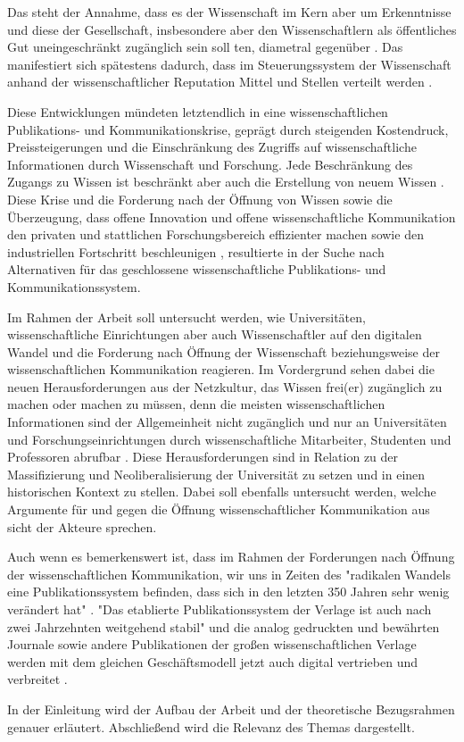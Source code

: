 Das steht der Annahme, dass es der Wissenschaft im Kern aber um Erkenntnisse und diese der Gesellschaft, insbesondere aber den Wissenschaftlern als öffentliches Gut uneingeschränkt zugänglich sein soll ten\cite{hanekop_2006}, diametral gegenüber \cite{offhaus_2012_institutionelle_repos}. Das manifestiert sich spätestens dadurch, dass im Steuerungssystem der Wissenschaft anhand der wissenschaftlicher Reputation Mittel und Stellen verteilt werden \cite{cite:4}.

Diese Entwicklungen mündeten letztendlich in eine wissenschaftlichen Publikations- und Kommunikationskrise, geprägt durch steigenden Kostendruck, Preissteigerungen und die Einschränkung des Zugriffs auf wissenschaftliche Informationen durch Wissenschaft und Forschung. Jede Beschränkung des Zugangs zu Wissen ist beschränkt aber auch die Erstellung von neuem Wissen \cite{cite:5} \cite{cite:8}. Diese Krise und die Forderung nach der Öffnung von Wissen sowie die Überzeugung, dass offene Innovation und offene wissenschaftliche Kommunikation den privaten und stattlichen Forschungsbereich effizienter machen sowie den industriellen Fortschritt beschleunigen \cite{cite:7}, resultierte in der Suche nach Alternativen für das geschlossene wissenschaftliche Publikations- und Kommunikationssystem. 

Im Rahmen der Arbeit soll untersucht werden, wie Universitäten, wissenschaftliche Einrichtungen aber auch Wissenschaftler auf den digitalen Wandel und die Forderung nach Öffnung der Wissenschaft beziehungsweise der wissenschaftlichen Kommunikation reagieren. Im Vordergrund sehen dabei die neuen Herausforderungen aus der Netzkultur, das Wissen frei(er) zugänglich zu machen oder machen zu müssen, denn die meisten wissenschaftlichen Informationen sind der Allgemeinheit nicht zugänglich und nur an Universitäten und Forschungseinrichtungen durch wissenschaftliche Mitarbeiter, Studenten und Professoren  abrufbar \cite{cite:6}. Diese Herausforderungen sind in Relation zu der Massifizierung und Neoliberalisierung der Universität zu setzen und in einen historischen Kontext zu stellen. Dabei soll ebenfalls untersucht werden, welche Argumente für und gegen die Öffnung wissenschaftlicher Kommunikation aus sicht der Akteure sprechen.

Auch wenn es bemerkenswert ist, dass im Rahmen der Forderungen nach Öffnung der wissenschaftlichen Kommunikation, wir uns in Zeiten des "radikalen Wandels eine Publikationssystem befinden, dass sich in den letzten 350 Jahren sehr wenig verändert hat" \cite{poynder_2011_suber}. "Das etablierte Publikationssystem der Verlage ist auch nach zwei Jahrzehnten weitgehend stabil"\cite{Hanekop_2014} und die analog gedruckten und bewährten Journale sowie andere Publikationen der großen wissenschaftlichen Verlage werden mit dem gleichen Geschäftsmodell jetzt auch digital vertrieben und verbreitet \cite{Hanekop_2014} \cite{boai_2012}.

In der Einleitung wird der Aufbau der Arbeit und der theoretische Bezugsrahmen genauer erläutert. Abschließend wird die Relevanz des Themas dargestellt.
